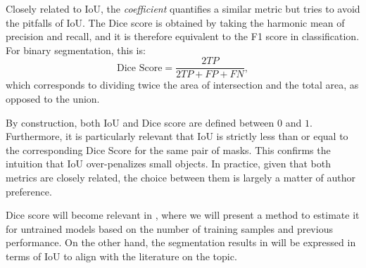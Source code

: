 Closely related to IoU, the \textit{ coefficient} quantifies a similar metric but tries to avoid the pitfalls of IoU. The Dice score is obtained by taking the harmonic mean of precision and recall, and it is therefore equivalent to the F1 score in classification. For binary segmentation, this is:
\begin{equation*}
    \text{Dice Score} = \dfrac{2TP}{2TP + FP + FN},
    \label{eq:dice}
\end{equation*}
which corresponds to dividing twice the area of intersection and the total area, as opposed to the union.

By construction, both IoU and Dice score are defined between $0$ and $1$. Furthermore, it is particularly relevant that IoU is strictly less than or equal to the corresponding Dice Score for the same pair of masks. This confirms the intuition that IoU over-penalizes small objects. In practice, given that both metrics are closely related, the choice between them is largely a matter of author preference.  

Dice score will become relevant in , where we will present a method to estimate it for untrained models based on the number of training samples and previous performance. On the other hand, the segmentation results in  will be expressed in terms of IoU to align with the literature on the topic.